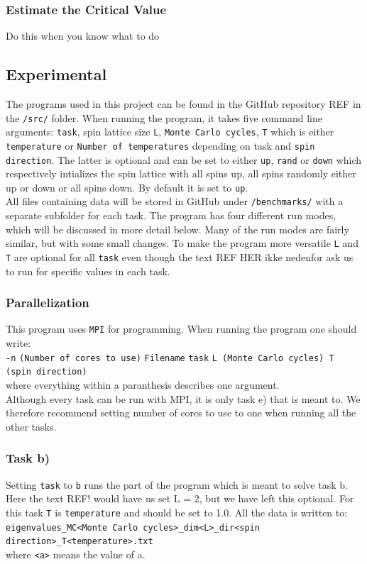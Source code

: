 \documentclass{article}
\newcommand{\husk}[1]{\color{red} #1 \color{black}}
\begin{document}
\subsubsection*{Estimate the Critical Value}
Do this when you know what to do 
\subsection*{Experimental}
The programs used in this project can be found in the GitHub repository \husk{REF} in the \texttt{/src/} folder. When running the program, it takes five command line arguments: \texttt{task}, spin lattice size \texttt{L}, \texttt{Monte Carlo cycles}, \texttt{T} which is either \texttt{temperature} or \texttt{Number of temperatures} depending on task and \texttt{spin direction}. The latter is optional and can be set to either \texttt{up}, \texttt{rand} or \texttt{down} which respectively intializes the spin lattice with all spins up, all spins randomly either up or down or all spins down. By default it is set to \texttt{up}. \\
All files containing data will be stored in GitHub under \texttt{/benchmarks/} with a separate subfolder for each task. The program has four different run modes, which will be discussed in more detail below. Many of the run modes are fairly similar, but with some small changes. To make the program more versatile \texttt{L} and \texttt{T} are optional for all \texttt{task} even though the text \husk{REF HER ikke nedenfor} ask us to run for specific values in each task.
\subsubsection*{Parallelization}
This program uses \texttt{MPI} for programming. When running the program one should write: \\ 
\texttt{-n} \texttt{(Number of cores to use)} \texttt{Filename} \texttt{task} \texttt{L (Monte Carlo cycles) T (spin direction)} \\
where everything within a paranthesis describes one argument. \\
Although every task can be run with MPI, it is only task e) that is meant to. We therefore recommend setting number of cores to use to one when running all the other tasks.
\subsubsection*{Task b)}
Setting \texttt{task} to \texttt{b} runs the part of the program which is meant to solve task b. Here the text\husk{REF!} would have us set L = 2, but we have left this optional. For this task \texttt{T} is \texttt{temperature} and should be set to 1.0. All the data is written to: \\
\texttt{eigenvalues\_MC<Monte Carlo cycles>\_dim<L>\_dir<spin direction>\_T<temperature>.txt}  \\
where \texttt{<a>} means the value of a.
\end{document}
